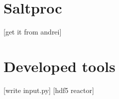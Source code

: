 
\section{Saltproc}

[get it from andrei]

\section{Developed tools}

[write input.py]
[hdf5 reactor]
